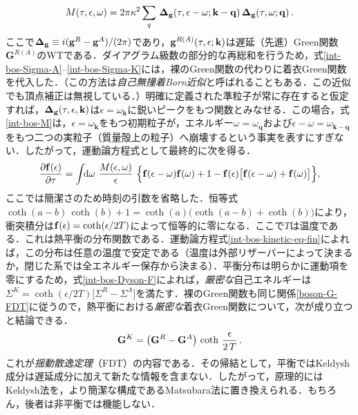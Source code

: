 \documentclass[a4paper,11pt]{ltjsarticle}
\def\d{\mathrm{d}}
\begin{document}
\begin{equation}\label{int-bos-M}
M(\tau,\epsilon,\omega) = 2\pi\kappa^2\sum_{q}\, {\bf
\Delta_{g}}(\tau,\epsilon-\omega;\mathbf{k}-\mathbf{q})\,{\bf
\Delta_{g}}(\tau,\omega;\mathbf{q})\, .
\end{equation}ここで${\bf \Delta_{g} }\equiv i({\bf g}^R - {\bf g}^A)/(2\pi)$であり，${\bf g}^{R(A)}(\tau,\epsilon;\mathbf{k})$は遅延（先進）Green関数$\mathbf{G}^{R(A)}$のWTである．ダイアグラム級数の部分的な再総和を行うため，式\eqref{int-bos-Sigma-A}--\eqref{int-bos-Sigma-K}には，裸のGreen関数の代わりに着衣Green関数を代入した．（この方法は\emph{自己無撞着Born近似}と呼ばれることもある．この近似でも頂点補正は無視している．）明確に定義された準粒子が常に存在すると仮定すれば，${\bf \Delta_{g}}(\tau,\epsilon,\mathbf{k})$は$\epsilon=\omega_\mathbf{k}$に鋭いピークをもつ関数とみなせる．この場合，式\eqref{int-bos-M}は，$\epsilon=\omega_\mathbf{k}$をもつ初期粒子が，エネルギー$\omega=\omega_\mathbf{q}$および$\epsilon-\omega=\omega_{\mathbf{k}-\mathbf{q}}$をもつ二つの実粒子（質量殻上の粒子）へ崩壊するという事実を表すにすぎない．したがって，運動論方程式として最終的に次を得る．
\begin{equation}\label{int-bos-kinetic-eq-fin}
{\partial {\bf f}(\epsilon)\over \partial\tau}= \int\!\! {\d\omega}\,\,
{M(\epsilon,\omega)\over \epsilon}\,\, \Big\{ {\bf
f}(\epsilon-\omega){\bf f}(\omega)+1 -{\bf f}(\epsilon)\big[{\bf
f}(\epsilon-\omega)+{\bf f}(\omega)\big]\Big\},
\end{equation}ここでは簡潔さのため時刻の引数を省略した．恒等式$\coth(a-b)\,\coth( b)+1=\coth(a)\big(\coth
(a-b)+\coth(b)\big)$により，衝突積分は${\bf f}(\epsilon)=\coth(\epsilon/2T)$によって恒等的に零になる．ここで$T$は温度である．これは熱平衡の分布関数である．運動論方程式\eqref{int-bos-kinetic-eq-fin}によれば，この分布は任意の温度で安定である（温度は外部リザーバーによって決まるか，閉じた系では全エネルギー保存から決まる）．平衡分布は明らかに運動項を零にするため，式\eqref{int-bos-Dyson-F}によれば，\emph{厳密な}自己エネルギーは$\Sigma^K=\coth(\epsilon/2T)\big[\Sigma^R-\Sigma^A\big]$を満たす．裸のGreen関数も同じ関係\eqref{boson-G-FDT}に従うので，熱平衡における\emph{厳密な}着衣Green関数について，次が成り立つと結論できる．
\begin{equation}\label{int-bos-FDT}
{\bf G}^K=\big({\bf G}^R - {\bf G}^A\big)\,\coth\, {\epsilon \over
2\,T}\, .
\end{equation}これが\emph{揺動散逸定理}（FDT）の内容である．その帰結として，平衡ではKeldysh成分は遅延成分に加えて新たな情報を含まない．したがって，原理的にはKeldysh法を，より簡潔な構成であるMatsubara法に置き換えられる．もちろん，後者は非平衡では機能しない．
\end{document}
